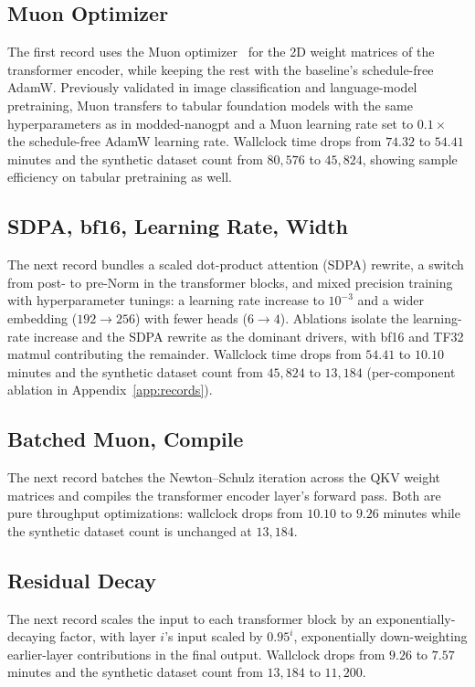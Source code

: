 \documentclass{article}
\theoremstyle{plain}
\theoremstyle{definition}
\theoremstyle{remark}
\begin{document}
\subsection{Muon Optimizer}
The first record uses the Muon optimizer~\citep{jordan2024muon} for the 2D weight matrices of the transformer encoder, while keeping the rest with the baseline's schedule-free AdamW.
Previously validated in image classification and language-model pretraining, Muon transfers to tabular foundation models with the same hyperparameters as in modded-nanogpt and a Muon learning rate set to $0.1\times$ the schedule-free AdamW learning rate.
Wallclock time drops from $74.32$ to $54.41$ minutes and the synthetic dataset count from $80{,}576$ to $45{,}824$, showing sample efficiency on tabular pretraining as well.

\subsection{SDPA, bf16, Learning Rate, Width}
The next record bundles a scaled dot-product attention (SDPA) rewrite, a switch from post- to pre-Norm in the transformer blocks, and mixed precision training with hyperparameter tunings: a learning rate increase to $10^{-3}$ and a wider embedding ($192\to 256$) with fewer heads ($6\to 4$).
Ablations isolate the learning-rate increase and the SDPA rewrite as the dominant drivers, with bf16 and TF32 matmul contributing the remainder.
Wallclock time drops from $54.41$ to $10.10$ minutes and the synthetic dataset count from $45{,}824$ to $13{,}184$ (per-component ablation in Appendix~\ref{app:records}).

\subsection{Batched Muon, Compile}
The next record batches the Newton--Schulz iteration across the QKV weight matrices and compiles the transformer encoder layer's forward pass.
Both are pure throughput optimizations: wallclock drops from $10.10$ to $9.26$ minutes while the synthetic dataset count is unchanged at $13{,}184$.

\subsection{Residual Decay}
The next record scales the input to each transformer block by an exponentially-decaying factor, with layer $i$'s input scaled by $0.95^i$, exponentially down-weighting earlier-layer contributions in the final output.
Wallclock drops from $9.26$ to $7.57$ minutes and the synthetic dataset count from $13{,}184$ to $11{,}200$.
\end{document}
